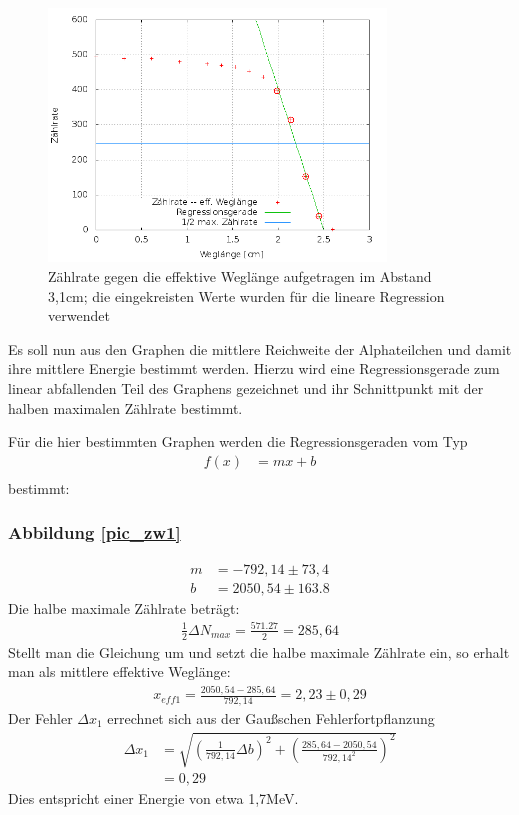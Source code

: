 \begin{figure}[H]
\includegraphics[width=0.8\textwidth]{pics/zaehlrate_weglaenge2.png}
\caption{Zählrate gegen die effektive Weglänge aufgetragen im Abstand 3,1cm; die eingekreisten Werte wurden für die lineare Regression verwendet}
\label{pic_zw2}
\end{figure}

Es soll nun aus den Graphen die mittlere Reichweite der Alphateilchen und damit ihre mittlere Energie bestimmt werden. Hierzu wird eine Regressionsgerade zum linear abfallenden Teil des Graphens gezeichnet und ihr Schnittpunkt mit der halben maximalen Zählrate bestimmt.

Für die hier bestimmten Graphen werden die Regressionsgeraden vom Typ
\begin{align*}
f(x)&=mx+b\\
\end{align*}
bestimmt: 
\subsubsection{Abbildung \ref{pic_zw1}}
\begin{align*}
m&=-792,14 \pm 73,4\\
b&= 2050,54 \pm 163.8
\end{align*}
Die halbe maximale Zählrate beträgt:
\begin{align*}
 \frac{1}{2}\Delta N_{max} = \frac{571.27}{2} = 285,64
\end{align*}
Stellt man die Gleichung um und setzt die halbe maximale Zählrate ein, so erhalt man als mittlere effektive Weglänge:
\begin{align*}
x_{eff1}=\frac{2050,54-285,64}{792,14} = 2,23\pm0,29
\end{align*}
Der Fehler $\Delta x_1$ errechnet sich aus der Gaußschen Fehlerfortpflanzung
\begin{align*}
\Delta x_1&=\sqrt{\left(\frac{1}{792,14}\Delta b\right)^2+\left(\frac{285,64-2050,54}{792,14^2}\right)^2}\\ 
&= 0,29
\end{align*}
Dies entspricht einer Energie von etwa 1,7MeV.

